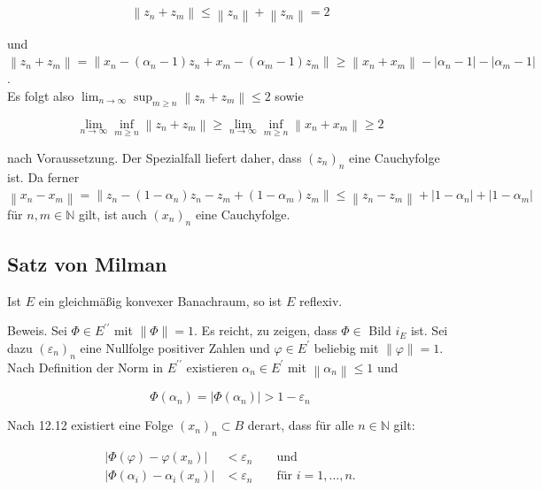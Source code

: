 \documentclass[10pt, letterpaper]{article}
\begin{document}
$$
\left\|z_{n}+z_{m}\right\| \leq\left\|z_{n}\right\|+\left\|z_{m}\right\|=2
$$

und\\
$\left\|z_{n}+z_{m}\right\|=\left\|x_{n}-\left(\alpha_{n}-1\right) z_{n}+x_{m}-\left(\alpha_{m}-1\right) z_{m}\right\| \geq\left\|x_{n}+x_{m}\right\|-\left|\alpha_{n}-1\right|-\left|\alpha_{m}-1\right|$.\\
Es folgt also $\lim _{n \rightarrow \infty} \sup _{m \geq n}\left\|z_{n}+z_{m}\right\| \leq 2$ sowie

$$
\lim _{n \rightarrow \infty} \inf _{m \geq n}\left\|z_{n}+z_{m}\right\| \geq \lim _{n \rightarrow \infty} \inf _{m \geq n}\left\|x_{n}+x_{m}\right\| \geq 2
$$

nach Voraussetzung. Der Spezialfall liefert daher, dass $\left(z_{n}\right)_{n}$ eine Cauchyfolge ist. Da ferner\\
$\left\|x_{n}-x_{m}\right\|=\left\|z_{n}-\left(1-\alpha_{n}\right) z_{n}-z_{m}+\left(1-\alpha_{m}\right) z_{m}\right\| \leq\left\|z_{n}-z_{m}\right\|+\left|1-\alpha_{n}\right|+\left|1-\alpha_{m}\right|$\\
für $n, m \in \mathbb{N}$ gilt, ist auch $\left(x_{n}\right)_{n}$ eine Cauchyfolge.

\subsection*{Satz von Milman}
Ist $E$ ein gleichmäßig konvexer Banachraum, so ist $E$ reflexiv.

Beweis. Sei $\Phi \in E^{\prime \prime}$ mit $\|\Phi\|=1$. Es reicht, zu zeigen, dass $\Phi \in$ Bild $i_{E}$ ist. Sei dazu $\left(\varepsilon_{n}\right)_{n}$ eine Nullfolge positiver Zahlen und $\varphi \in E^{\prime}$ beliebig mit $\|\varphi\|=1$. Nach Definition der Norm in $E^{\prime \prime}$ existieren $\alpha_{n} \in E^{\prime}$ mit $\left\|\alpha_{n}\right\| \leq 1$ und

$$
\Phi\left(\alpha_{n}\right)=\left|\Phi\left(\alpha_{n}\right)\right|>1-\varepsilon_{n}
$$

Nach 12.12 existiert eine Folge $\left(x_{n}\right)_{n} \subset B$ derart, dass für alle $n \in \mathbb{N}$ gilt:

$$
\begin{aligned}
\left|\Phi(\varphi)-\varphi\left(x_{n}\right)\right| & <\varepsilon_{n} & & \text { und } \\
\left|\Phi\left(\alpha_{i}\right)-\alpha_{i}\left(x_{n}\right)\right| & <\varepsilon_{n} & & \text { für } i=1, \ldots, n .
\end{aligned}
$$
\end{document}
